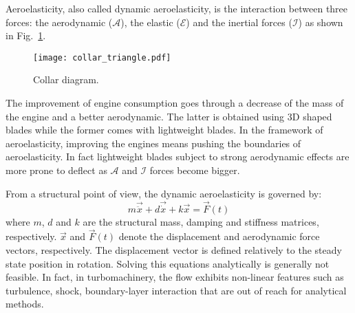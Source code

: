 
Aeroelasticity, also called dynamic aeroelasticity,
is the interaction between three forces:
the aerodynamic ($\mathcal{A}$), the elastic ($\mathcal{E}$) and
the inertial forces ($\mathcal{I}$) as 
shown in Fig.~\ref{fig:ael_collar_triangle}. 
\begin{figure}[htb]
  \centering
  \texttt{[image: collar\_triangle.pdf]}
  \caption{Collar diagram.}
  \label{fig:ael_collar_triangle}
\end{figure}

The improvement of engine consumption goes through a 
decrease of the mass of the engine and a better aerodynamic.
The latter is obtained using 3D shaped blades while the former
comes with lightweight blades. In the framework of
aeroelasticity, improving the engines means pushing the boundaries
of aeroelasticity. In fact lightweight blades subject
to strong aerodynamic effects are more prone to deflect as 
$\mathcal{A}$ and $\mathcal{I}$ forces become bigger.

From a structural point of view, 
the dynamic aeroelasticity is governed by:
\begin{equation}
	m \vec{\ddot{x}} + d \vec{\dot{x}} + k \vec{x} = \vec{F}(t)
	\label{eq:ael_motion_eq}
\end{equation}
where $m$, $d$ and $k$ are the structural mass, damping 
and stiffness matrices, respectively.
$\vec{x}$ and $\vec{F}(t)$ denote the displacement 
and aerodynamic force vectors, respectively. The displacement
vector is defined relatively to the 
steady state position in rotation.
Solving this equations analytically is generally 
not feasible. In fact, in turbomachinery, 
the flow exhibits non-linear features such as turbulence, shock,
boundary-layer interaction that are out of reach for
analytical methods.
